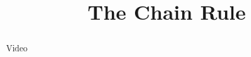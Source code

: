\documentclass[handout]{ximera}
\title{The Chain Rule}
\begin{document}
\begin{abstract} Video %
\end{abstract}

\maketitle

\end{document}
